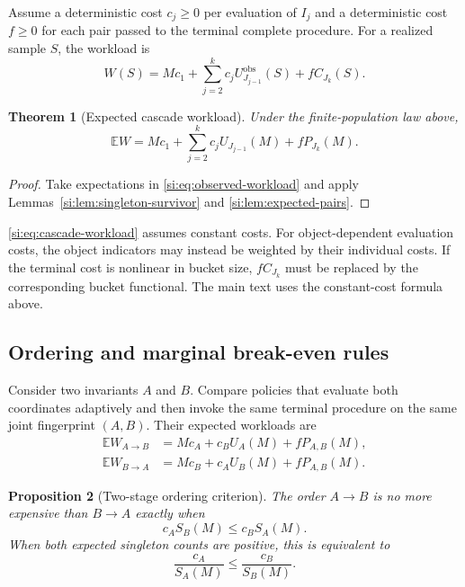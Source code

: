\documentclass[9pt,twoside]{pnas-new}
\newtheorem{theorem}{Theorem}
\newtheorem{proposition}[theorem]{Proposition}
\theoremstyle{definition}
\theoremstyle{remark}
\begin{document}
Assume a deterministic cost $c_j\ge0$ per evaluation of $I_j$ and a deterministic cost $f\ge0$ for each pair passed to the terminal complete procedure.  For a realized sample $S$, the workload is
\begin{equation}
 W(S)
 =Mc_1+\sum_{j=2}^k c_jU_{J_{j-1}}^{\mathrm{obs}}(S)
   +fC_{J_k}(S).
 \label{si:eq:observed-workload}
\end{equation}

\begin{theorem}[Expected cascade workload]
\label{si:thm:cascade-workload}
Under the finite-population law above,
\begin{equation}
 \boxed{
 \mathbb EW
 =Mc_1+\sum_{j=2}^k c_jU_{J_{j-1}}(M)
   +fP_{J_k}(M).}
 \label{si:eq:cascade-workload}
\end{equation}
\end{theorem}

\begin{proof}
Take expectations in \eqref{si:eq:observed-workload} and apply Lemmas~\ref{si:lem:singleton-survivor} and \ref{si:lem:expected-pairs}.
\end{proof}

\eqref{si:eq:cascade-workload} assumes constant costs. For object-dependent evaluation costs, the object indicators may instead be weighted by their individual costs.  If the terminal cost is nonlinear in bucket size, $fC_{J_k}$ must be replaced by the corresponding bucket functional. The main text uses the constant-cost formula above.

\subsection{Ordering and marginal break-even rules}
Consider two invariants $A$ and $B$.  Compare policies that evaluate both coordinates adaptively and then invoke the same terminal procedure on the same joint fingerprint $(A,B)$.  Their expected workloads are
\begin{align*}
 \mathbb EW_{A\to B}
 &=Mc_A+c_BU_A(M)+fP_{A,B}(M),\\
 \mathbb EW_{B\to A}
 &=Mc_B+c_AU_B(M)+fP_{A,B}(M).
\end{align*}

\begin{proposition}[Two-stage ordering criterion]
\label{si:prop:ordering}
The order $A\to B$ is no more expensive than $B\to A$ exactly when
\begin{equation}
 c_AS_B(M)\le c_BS_A(M).
 \label{si:eq:ordering}
\end{equation}
When both expected singleton counts are positive, this is equivalent to
\begin{equation}
 \frac{c_A}{S_A(M)}\le\frac{c_B}{S_B(M)}.
 \label{si:eq:cost-per-singleton}
\end{equation}
\end{proposition}
\end{document}
